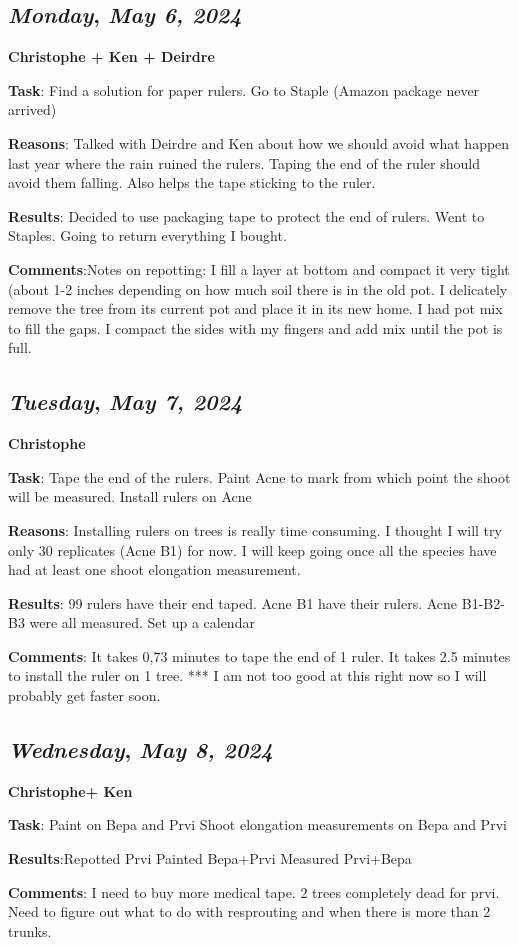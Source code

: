 \def\day{\textit{May 6, 2024}}
\def\weekday{\textit{Monday}}
\subsection*{\weekday, \day}
\textbf{Christophe + Ken + Deirdre}
\par 
\textbf {Task}: Find a solution for paper rulers.
Go to Staple (Amazon package never arrived)
\par 
\textbf {Reasons}: Talked with Deirdre and Ken about how we should avoid what happen last year where the rain ruined the rulers. Taping the end of the ruler should avoid them falling. Also helps the tape sticking to the ruler. 
\par 
\textbf {Results}: Decided to use packaging tape to protect the end of rulers.
Went to Staples. Going to return everything I bought.
\par 
\textbf {Comments}:Notes on repotting: I fill a layer at bottom and compact it very tight (about 1-2 inches depending on how much soil there is in the old pot. I delicately remove the tree from its current pot and place it in its new home. I had pot mix to fill the gaps. I compact the sides with my fingers and add mix until the pot is full. 

\def\day{\textit{May 7, 2024}}
\def\weekday{\textit{Tuesday}}
\subsection*{\weekday, \day}
\textbf{Christophe}
\par 
\textbf {Task}: Tape the end of the rulers.
Paint Acne to mark from which point the shoot will be measured. 
Install rulers on Acne
\par 
\textbf {Reasons}: Installing rulers on trees is really time consuming. I thought I will try only 30 replicates (Acne B1) for now. I will keep going once all the species have had at least one shoot elongation measurement. 
\par  
\textbf {Results}: 99 rulers have their end taped. 
Acne B1 have their rulers.
Acne B1-B2-B3 were all measured.
Set up a calendar
\par 
\textbf {Comments}: It takes 0,73 minutes to tape the end of 1 ruler.
It takes 2.5 minutes to install the ruler on 1 tree. *** I am not too good at this right now so I will probably get faster soon. 

\def\day{\textit{May 8, 2024}}
\def\weekday{\textit{Wednesday}}
\subsection*{\weekday, \day}
\textbf{Christophe+ Ken}
\par 
\textbf {Task}: Paint on Bepa and Prvi
Shoot elongation measurements on Bepa and Prvi
\par 
\textbf {Results}:Repotted Prvi
Painted Bepa+Prvi
Measured Prvi+Bepa
\par 
\textbf {Comments}: I need to buy more medical tape.
2 trees completely dead for prvi.
Need to figure out what to do with resprouting and when there is more than 2 trunks. 


